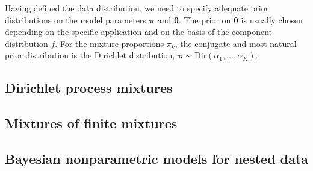 Having defined the data distribution, we need to specify adequate prior distributions on the model parameters $\bm{\pi}$ and $\bm{\theta}$. The prior on $\bm{\theta}$ is usually chosen depending on the specific application and on the basis of the component distribution $f$. For the mixture proportions $\pi_k$, the conjugate and most natural prior distribution is the Dirichlet distribution, $\bm{\pi}\sim \mathrm{Dir}(\alpha_1,\dots,\alpha_K)$.





\subsection{Dirichlet process mixtures}


\subsection{Mixtures of finite mixtures}


\subsection{Bayesian nonparametric models for nested data}
















